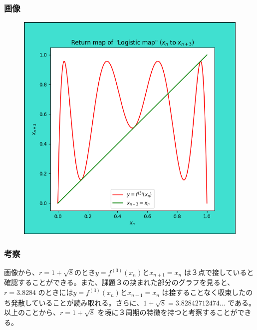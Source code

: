 \subsubsection{画像}
\begin{figure}[htbp]
  \centering
  \includegraphics[keepaspectratio, scale=0.5]{images/Problem7/tast7_4.png}
\end{figure}

\subsubsection{考察}
画像から、$r = 1 + \sqrt{8} のとき y = f^{(3)} \left( x_n \right) と x_{n+1} = x_n$ は３点で接していると確認することができる。また、課題３の挟まれた部分のグラフを見ると、$r = 3.8284$ のときには$y = f^{(3)} \left( x_n \right) と x_{n+1} = x_n$ は接することなく収束したのち発散していることが読み取れる。さらに、$1 + \sqrt{8} = 3.82842712474...$ である。以上のことから、$r = 1 + \sqrt{8}$ を境に３周期の特徴を持つと考察することができる。

